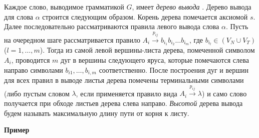 \documentclass[12pt]{article}
\begin{document}
Каждое слово, выводимое грамматикой $G$, имеет \textit{дерево вывода} \cite{aho-ulman-syntax}. Дерево вывода для слова $\alpha$ строится следующим образом. Корень дерева помечается аксиомой $s$. Далее последовательно рассматриваются правила левого вывода слова $\alpha$. Пусть на очередном шаге рассматривается правило $A_i \xrightarrow{p_{ij}} b_{i_1} b_{i_2} \ldots b_{i_m}$, где $b_{i_l} \in (V_N \cup V_T)$ ($l = 1,\ldots,m$). Тогда из самой левой вершины-листа дерева, помеченной символом $A_i$, проводится $m$ дуг в вершины следующего яруса, которые помечаются слева направо символами $b_{i1}, \ldots, b_{i,m}$ соответственно. После построения дуг и вершин для всех правил в выводе листья дерева помечены терминальными символами (либо пустым словом $\lambda$, если применяется правило вида $A_i \xrightarrow{p_{ij}} \lambda$) и само слово получается при обходе листьев дерева слева направо. \textit{Высотой} дерева вывода будем называть максимальную длину пути от корня к листу.

\hrulefill

\textbf{Пример}
\end{document}
